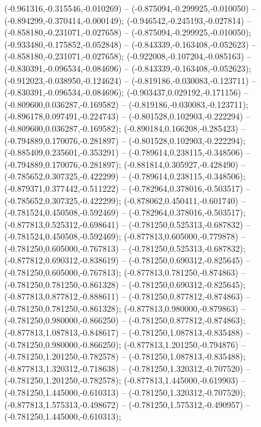  (-0.961316,-0.315546,-0.010269) -- (-0.875094,-0.299925,-0.010050) -- (-0.894299,-0.370414,-0.000149);
 (-0.946542,-0.245193,-0.027814) -- (-0.858180,-0.231071,-0.027658) -- (-0.875094,-0.299925,-0.010050);
 (-0.933480,-0.175852,-0.052848) -- (-0.843339,-0.163408,-0.052623) -- (-0.858180,-0.231071,-0.027658);
 (-0.922008,-0.107204,-0.085163) -- (-0.830391,-0.096534,-0.084696) -- (-0.843339,-0.163408,-0.052623);
 (-0.912023,-0.038950,-0.124624) -- (-0.819186,-0.030083,-0.123711) -- (-0.830391,-0.096534,-0.084696);
 (-0.903437,0.029192,-0.171156) -- (-0.809600,0.036287,-0.169582) -- (-0.819186,-0.030083,-0.123711);
 (-0.896178,0.097491,-0.224743) -- (-0.801528,0.102903,-0.222294) -- (-0.809600,0.036287,-0.169582);
 (-0.890184,0.166208,-0.285423) -- (-0.794889,0.170076,-0.281897) -- (-0.801528,0.102903,-0.222294);
 (-0.885409,0.235601,-0.353291) -- (-0.789614,0.238115,-0.348506) -- (-0.794889,0.170076,-0.281897);
 (-0.881814,0.305927,-0.428490) -- (-0.785652,0.307325,-0.422299) -- (-0.789614,0.238115,-0.348506);
 (-0.879371,0.377442,-0.511222) -- (-0.782964,0.378016,-0.503517) -- (-0.785652,0.307325,-0.422299);
 (-0.878062,0.450411,-0.601740) -- (-0.781524,0.450508,-0.592469) -- (-0.782964,0.378016,-0.503517);
 (-0.877813,0.525312,-0.698641) -- (-0.781250,0.525313,-0.687832) -- (-0.781524,0.450508,-0.592469);
 (-0.877813,0.605000,-0.779878) -- (-0.781250,0.605000,-0.767813) -- (-0.781250,0.525313,-0.687832);
 (-0.877812,0.690312,-0.838619) -- (-0.781250,0.690312,-0.825645) -- (-0.781250,0.605000,-0.767813);
 (-0.877813,0.781250,-0.874863) -- (-0.781250,0.781250,-0.861328) -- (-0.781250,0.690312,-0.825645);
 (-0.877813,0.877812,-0.888611) -- (-0.781250,0.877812,-0.874863) -- (-0.781250,0.781250,-0.861328);
 (-0.877813,0.980000,-0.879863) -- (-0.781250,0.980000,-0.866250) -- (-0.781250,0.877812,-0.874863);
 (-0.877813,1.087813,-0.848617) -- (-0.781250,1.087813,-0.835488) -- (-0.781250,0.980000,-0.866250);
 (-0.877813,1.201250,-0.794876) -- (-0.781250,1.201250,-0.782578) -- (-0.781250,1.087813,-0.835488);
 (-0.877813,1.320312,-0.718638) -- (-0.781250,1.320312,-0.707520) -- (-0.781250,1.201250,-0.782578);
 (-0.877813,1.445000,-0.619903) -- (-0.781250,1.445000,-0.610313) -- (-0.781250,1.320312,-0.707520);
 (-0.877813,1.575313,-0.498672) -- (-0.781250,1.575312,-0.490957) -- (-0.781250,1.445000,-0.610313);
